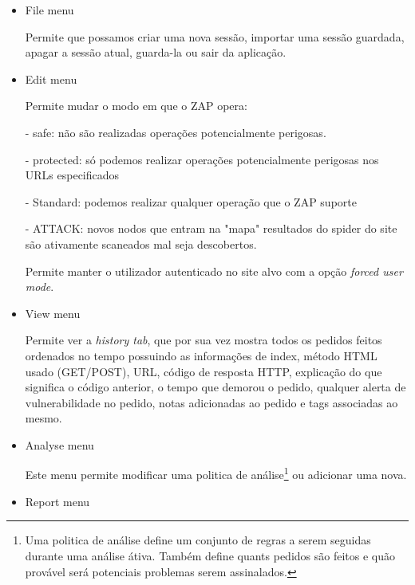 \begin{itemize}
\item File menu\newline

\par Permite que possamos criar uma nova sessão, importar uma sessão guardada, apagar a sessão atual, guarda-la ou sair da aplicação.

\item Edit menu \newline

\par Permite mudar o modo em que o ZAP opera: 

- safe: não são realizadas operações potencialmente perigosas.

- protected: só podemos realizar operações potencialmente perigosas nos URLs especificados

- Standard: podemos realizar qualquer operação que o ZAP suporte

- ATTACK: novos nodos que entram na "mapa" resultados do spider do site são ativamente scaneados mal seja descobertos.

\par Permite manter o utilizador autenticado no site alvo com a opção \textit{forced user mode}.


\item View menu \newline

\par Permite ver a \textit{history tab}, que por sua vez mostra todos os pedidos feitos ordenados no tempo possuindo as informações de index, método HTML usado (GET/POST), URL, código de resposta HTTP, explicação do que significa o código anterior, o tempo que demorou o pedido, qualquer alerta de vulnerabilidade no pedido, notas adicionadas ao pedido e tags associadas ao mesmo.  


\item Analyse menu \newline

\par Este menu permite modificar uma politica de análise\footnote[1]{Uma politica de análise define um conjunto de regras a serem seguidas durante uma análise átiva. Também define quants pedidos são feitos e quão provável será potenciais problemas serem assinalados.} ou adicionar uma nova.


\item Report menu  \newline


\end{itemize}
